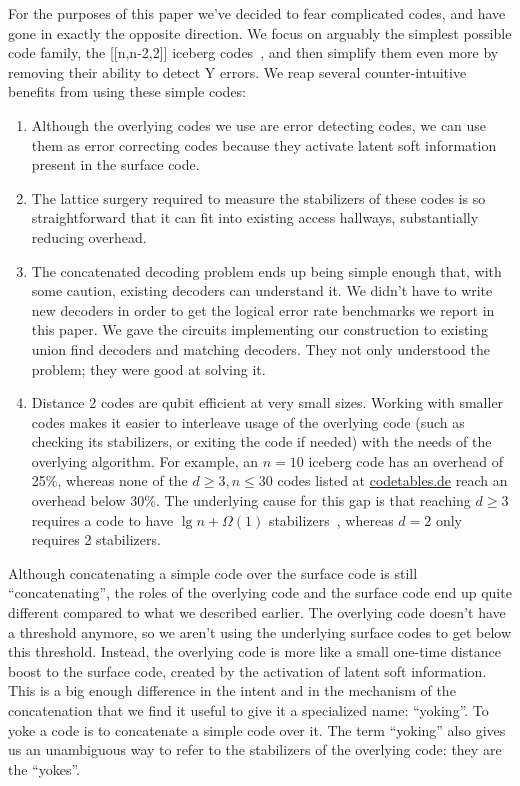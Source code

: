 \documentclass[onecolumn,unpublished,a4paper]{quantumarticle}
\theoremstyle{definition}
\theoremstyle{definition}
\theoremstyle{definition}
\begin{document}
For the purposes of this paper we've decided to fear complicated codes, and have gone in exactly the opposite direction.
We focus on arguably the simplest possible code family, the [[n,n-2,2]] iceberg codes~\cite{steane1996simpleqec,self2022iceberg}, and then simplify them even more by removing their ability to detect Y errors.
We reap several counter-intuitive benefits from using these simple codes:

\begin{enumerate}
    \item
    Although the overlying codes we use are error detecting codes, we can use them as error correcting codes because they activate latent soft information present in the surface code.
    \item
    The lattice surgery required to measure the stabilizers of these codes is so straightforward that it can fit into existing access hallways, substantially reducing overhead.
    \item
    The concatenated decoding problem ends up being simple enough that, with some caution, existing decoders can understand it.
    We didn't have to write new decoders in order to get the logical error rate benchmarks we report in this paper.
    We gave the circuits implementing our construction to existing union find decoders and matching decoders.
    They not only understood the problem; they were good at solving it.
    \item
    Distance 2 codes are qubit efficient at very small sizes.
    Working with smaller codes makes it easier to interleave usage of the overlying code (such as checking its stabilizers, or exiting the code if needed) with the needs of the overlying algorithm.
    For example, an $n=10$ iceberg code has an overhead of 25\%, whereas none of the $d \geq 3, n \leq 30$ codes listed at \href{http://codetables.de/}{codetables.de} reach an overhead below 30\%.
    The underlying cause for this gap is that reaching $d \geq 3$ requires a code to have $\lg n + \Omega(1)$ stabilizers~\cite{gottesman1996hammingbound}, whereas $d=2$ only requires 2 stabilizers.
\end{enumerate}

Although concatenating a simple code over the surface code is still ``concatenating'', the roles of the overlying code and the surface code end up quite different compared to what we described earlier.
The overlying code doesn't have a threshold anymore, so we aren't using the underlying surface codes to get below this threshold.
Instead, the overlying code is more like a small one-time distance boost to the surface code, created by the activation of latent soft information.
This is a big enough difference in the intent and in the mechanism of the concatenation that we find it useful to give it a specialized name: ``yoking''.
To yoke a code is to concatenate a simple code over it.
The term ``yoking'' also gives us an unambiguous way to refer to the stabilizers of the overlying code: they are the ``yokes''.
\end{document}
